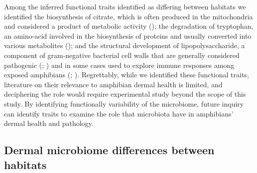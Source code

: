 \documentclass[
  12pt,
]{article}
\begin{document}
Among the inferred functional traits identified as differing between
habitats we identified the biosynthesis of citrate, which is often
produced in the mitochondria and considered a product of metabolic
activity (); the degradation of tryptophan, an amino-acid involved in the
biosynthesis of proteins and usually converted into various metabolites
(); and the
structural development of lipopolysaccharide, a component of
gram-negative bacterial cell walls that are generally considered
pathogenic (;
)
and in some cases used to explore immune responses among exposed
amphibians (;
).
Regrettably, while we identified these functional traits, literature on
their relevance to amphibian dermal health is limited, and deciphering
the role would require experimental study beyond the scope of this
study. By identifying functionally variability of the microbiome, future
inquiry can identify traits to examine the role that microbiota have in
amphibians' dermal health and pathology.

\subsection{Dermal microbiome differences between
habitats}\label{dermal-microbiome-differences-between-habitats}
\end{document}
